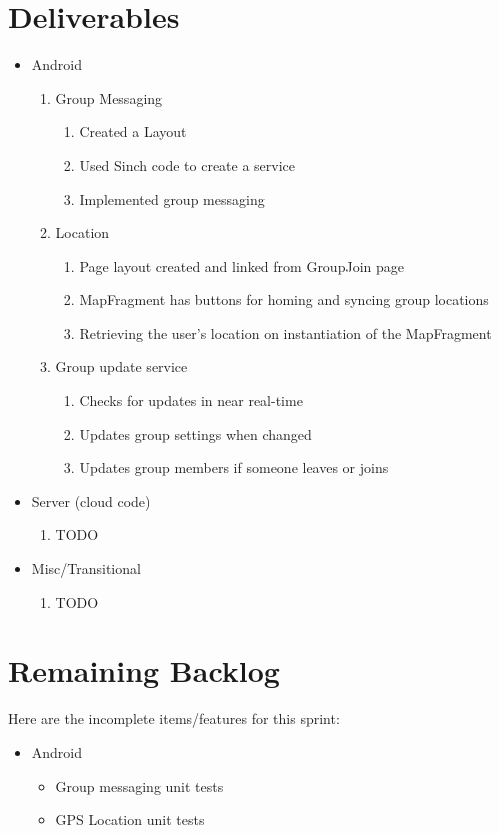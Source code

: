 \documentclass[11pt]{article}
\begin{document}
\section*{Deliverables}
	\begin{itemize}
	\item Android
		\begin{enumerate}
		\item Group Messaging
			\begin{enumerate}
			\item Created a Layout
			\item Used Sinch code to create a service
			\item Implemented group messaging
			\end{enumerate}
		\item Location
			\begin{enumerate}
			\item Page layout created and linked from GroupJoin page
			\item MapFragment has buttons for homing and syncing group locations
			\item Retrieving the user's location on instantiation of the MapFragment
			\end{enumerate}
		\item Group update service
			\begin{enumerate}
			\item Checks for updates in near real-time
			\item Updates group settings when changed
			\item Updates group members if someone leaves or joins
			\end{enumerate}
		\end{enumerate}

	\item Server (cloud code)
		\begin{enumerate}
			\item TODO
		\end{enumerate}
		
	\item Misc/Transitional
		\begin{enumerate}
			\item TODO
		\end{enumerate}

	\end{itemize}

\section*{Remaining Backlog}
Here are the incomplete items/features for this sprint:
	\begin{itemize}
		\item Android
		\begin{itemize}
			\item Group messaging unit tests
			\item GPS Location unit tests
		\end{itemize}
	\end{itemize}
\end{document}
